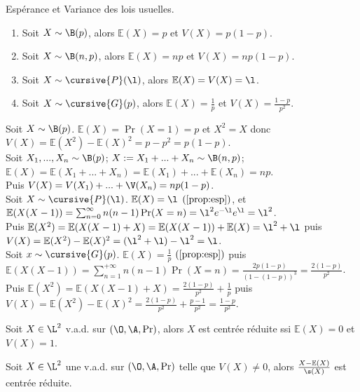 \documentclass[11pt]{article}
\renewcommand*{\E}{\mathbb{E}}
\begin{document}
\begin{prop}{Espérance et Variance des lois usuelles.}{}
    \begin{enumerate}
        \item Soit $X\sim\B(p)$, alors $\E(X)=p$ et $V(X)=p(1-p)$.
        \item Soit $X\sim\B(n,p)$, alors $\E(X)=np$ et $V(X)=np(1-p)$.
        \item Soit $X\sim\cursive{P}(\l)$, alors $\E(X)=V(X)=\l$.
        \item Soit $X\sim\cursive{G}(p)$, alors $\E(X)=\frac{1}{p}$ et $V(X)=\frac{1-p}{p^2}$.
    \end{enumerate}
    \tcblower
     Soit $X\sim \B(p)$. $\E(X)=\Pr(X=1)=p$ et $X^2=X$ donc $V(X)=\E(X^2)-\E(X)^2 = p-p^2 = p(1-p)$.\\
     Soit $X_1,...,X_n\sim\B(p)$; $X:=X_1+...+X_n\sim\B(n,p)$; $\E(X)=\E(X_1+...+X_n)=\E(X_1)+...+\E(X_n)=np$.\\
    Puis $V(X)=V(X_1)+...+\V(X_n)=np(1-p)$.\\
     Soit $X\sim\cursive{P}(\l)$. $\E(X)=\l$ $(\ref{prop:esp})$, et $\E(X(X-1))=\sum_{n=0}^\infty n(n-1)\Pr(X=n)=\l^2e^{-\l}e^\l=\l^2$.\\
    Puis $\E(X^2)=\E(X(X-1)+X)=\E(X(X-1))+\E(X)=\l^2+\l$ puis $V(X)=\E(X^2)-\E(X)^2=(\l^2+\l)-\l^2 = \l$.\\
     Soit $x\sim\cursive{G}(p)$. $\E(X)=\frac{1}{p}$ $(\ref{prop:esp})$ puis $\E(X(X-1))=\sum_{n=1}^{+\infty}n(n-1)\Pr(X=n)=\frac{2p(1-p)}{(1-(1-p))^3}=\frac{2(1-p)}{p^2}$.\\
    Puis $\E(X^2)=\E(X(X-1)+X)=\frac{2(1-p)}{p^2} + \frac{1}{p}$ puis $V(X)=\E(X^2)-\E(X)^2 = \frac{2(1-p)}{p^2} + \frac{p-1}{p^2} = \frac{1-p}{p^2}$.
\end{prop}

\vspace*{-0.5cm}

\begin{defi}{}{}
    Soit $X\in\L^2$ v.a.d. sur $(\O,\A,\Pr)$, alors $X$ est centrée réduite ssi $\E(X)=0$ et $V(X)=1$.
\end{defi}

\vspace*{-0.5cm}

\begin{prop}{}{}
    Soit $X\in\L^2$ une v.a.d. sur $(\O,\A,\Pr)$ telle que $V(X)\neq 0$, alors $\frac{X-\E(X)}{\s(X)}$ est centrée réduite.
\end{prop}
\end{document}

